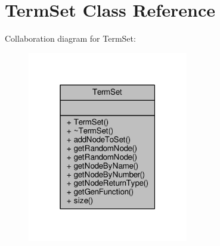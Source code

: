 \hypertarget{classTermSet}{}\section{Term\+Set Class Reference}
\label{classTermSet}


Collaboration diagram for Term\+Set\+:
\nopagebreak
\begin{figure}[H]
\begin{center}
\leavevmode
\includegraphics[width=199pt]{classTermSet__coll__graph}
\end{center}
\end{figure}

